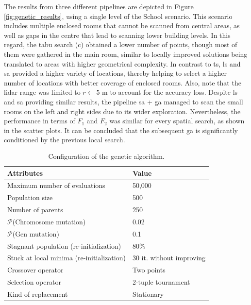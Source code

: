 The results from three different pipelines are depicted in Figure \ref{fig:genetic_results}, using a single level of the School scenario. This scenario includes multiple enclosed rooms that cannot be scanned from central areas, as well as gaps in the centre that lead to scanning lower building levels. In this regard, the tabu search (c) obtained a lower number of points, though most of them were gathered in the main room, similar to locally improved solutions being translated to areas with higher geometrical complexity. In contrast to \acrshort{ts}, \acrshort{ls} and \acrshort{sa} provided a higher variety of locations, thereby helping to select a higher number of locations with better coverage of enclosed rooms. Also, note that the \acrshort{lidar} range was limited to $r \gets 5$ \si{\meter} to account for the accuracy loss. Despite \acrshort{ls} and \acrshort{sa} providing similar results, the pipeline \acrshort{sa} + \acrshort{ga} managed to scan the small rooms on the left and right sides due to its wider exploration. Nevertheless, the performance in terms of $F_1$ and $F_2$ was similar for every spatial search, as shown in the scatter plots. It can be concluded that the subsequent \acrshort{ga} is significantly conditioned by the previous local search.

\renewcommand{\arraystretch}{1.15}
\begin{table}
\caption{Configuration of the genetic algorithm.}
\label{table:genetic_algorithm_parameters}
\begin{tabular}{ll}
\toprule
\textbf{Attributes} & \textbf{Value}\\
\midrule
Maximum number of evaluations & 50,000\\
Population size & 500\\
Number of parents & 250\\
$\mathcal{P}$(Chromosome mutation) & 0.02\\
$\mathcal{P}$(Gen mutation) & 0.1\\
Stagnant population (re-initialization) & 80\%\\
Stuck at local minima (re-initialization) & 30 it. without improving\\
Crossover operator & Two points\\
Selection operator & 2-tuple tournament\\
Kind of replacement & Stationary\\
\bottomrule
\end{tabular}
\end{table}
\renewcommand{\arraystretch}{1}

